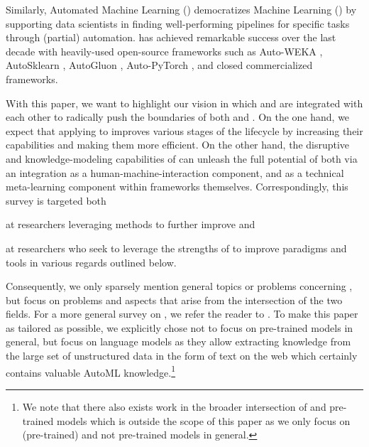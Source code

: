\documentclass[10pt]{article} %
\begin{document}
Similarly, Automated Machine Learning (\AutoML) \citep{hutter-book19a} democratizes Machine Learning (\ML) by supporting data scientists in finding well-performing \ML pipelines for specific tasks through (partial) automation. \AutoML has achieved remarkable success over the last decade with heavily-used open-source frameworks such as Auto-WEKA \citep{thornton-kdd13a,kotthoff-jmlr17a,kotthoff-automlbook19a}, AutoSklearn \citep{feurer-nips15a,feurer-automlbook19b,feurer-jmlr22a}, AutoGluon \citep{erickson-arxiv20a}, Auto-PyTorch \citep{zimmer-tpami21a}, and closed commercialized frameworks. 

With this paper, we want to highlight our vision in which \AutoML and \LLMs are integrated with each other to radically push the boundaries of both \AutoML and \NLP. On the one hand, we expect that applying \AutoML to \LLMs improves various stages of the \LLM lifecycle by increasing their capabilities and making them more efficient. On the other hand, the disruptive \NLP and knowledge-modeling capabilities of \LLMs can unleash the full potential of \AutoML both via an integration as a human-machine-interaction component, and as a technical meta-learning component within \AutoML frameworks themselves. Correspondingly, this survey is targeted both 
\begin{inparaenum}[1)]
    \item at \NLP researchers leveraging \AutoML methods to further improve \LLMs and
    \item at \AutoML researchers who seek to leverage the strengths of \LLMs to improve \AutoML paradigms and tools in various regards outlined below.
\end{inparaenum} Consequently, we only sparsely mention general topics or problems concerning \LLMs, but focus on problems and aspects that arise from the intersection of the two fields. For a more general survey on \LLMs, we refer the reader to \cite{zhao-arxiv23a}. To make this paper as tailored as possible, we explicitly chose not to focus on pre-trained models in general, but focus on language models as they allow extracting knowledge from the large set of unstructured data in the form of text on the web which certainly contains valuable AutoML knowledge.\footnote{We note that there also exists work in the broader intersection of \AutoML and pre-trained models \citep{hollmann-iclr23a,muller-icml23a} which is outside the scope of this paper as we only focus on (pre-trained) \LLMs and not pre-trained models in general.}
\end{document}
